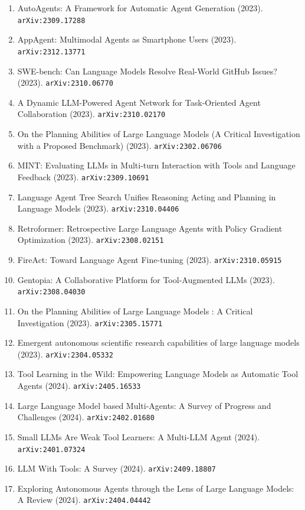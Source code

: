 \documentclass[11pt]{article}
\begin{document}
\begin{enumerate}
  Tools and Which to Use (2023). \texttt{arXiv:2310.03128}
  \item AutoAgents: A Framework for Automatic Agent Generation (2023). \texttt{arXiv:2309.17288}
  \item AppAgent: Multimodal Agents as Smartphone Users (2023). \texttt{arXiv:2312.13771}
  \item SWE-bench: Can Language Models Resolve Real-World GitHub Issues? (2023). \texttt{arXiv:2310.06770}
  \item A Dynamic LLM-Powered Agent Network for Task-Oriented Agent
  Collaboration (2023). \texttt{arXiv:2310.02170}
  \item On the Planning Abilities of Large Language Models (A Critical
  Investigation with a Proposed Benchmark) (2023). \texttt{arXiv:2302.06706}
  \item MINT: Evaluating LLMs in Multi-turn Interaction with Tools and Language
  Feedback (2023). \texttt{arXiv:2309.10691}
  \item Language Agent Tree Search Unifies Reasoning Acting and Planning in
  Language Models (2023). \texttt{arXiv:2310.04406}
  \item Retroformer: Retrospective Large Language Agents with Policy Gradient
  Optimization (2023). \texttt{arXiv:2308.02151}
  \item FireAct: Toward Language Agent Fine-tuning (2023). \texttt{arXiv:2310.05915}
  \item Gentopia: A Collaborative Platform for Tool-Augmented LLMs (2023). \texttt{arXiv:2308.04030}
  \item On the Planning Abilities of Large Language Models : A Critical
  Investigation (2023). \texttt{arXiv:2305.15771}
  \item Emergent autonomous scientific research capabilities of large language
  models (2023). \texttt{arXiv:2304.05332}
  \item Tool Learning in the Wild: Empowering Language Models as Automatic Tool
  Agents (2024). \texttt{arXiv:2405.16533}
  \item Large Language Model based Multi-Agents: A Survey of Progress and
  Challenges (2024). \texttt{arXiv:2402.01680}
  \item Small LLMs Are Weak Tool Learners: A Multi-LLM Agent (2024). \texttt{arXiv:2401.07324}
  \item LLM With Tools: A Survey (2024). \texttt{arXiv:2409.18807}
  \item Exploring Autonomous Agents through the Lens of Large Language Models: A
  Review (2024). \texttt{arXiv:2404.04442}

\end{enumerate}
\end{document}
